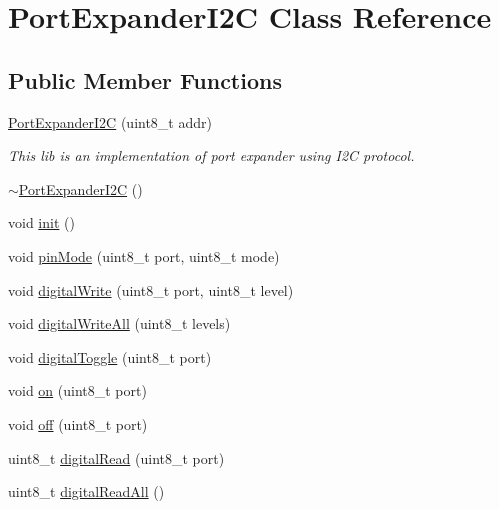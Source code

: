 \hypertarget{classPortExpanderI2C}{}\section{Port\+Expander\+I2C Class Reference}
\label{classPortExpanderI2C}
\subsection*{Public Member Functions}
\begin{DoxyCompactItemize}
\item 
\mbox{\hyperlink{classPortExpanderI2C_ae4f051ad2540a810dfd9edaa8e03c5f7}{Port\+Expander\+I2C}} (uint8\+\_\+t addr)
\begin{DoxyCompactList}\small\item\em This lib is an implementation of port expander using I2C protocol. \end{DoxyCompactList}\item 
\mbox{\hyperlink{classPortExpanderI2C_a0720aaddf0dee2b43435b2df22a52a25}{$\sim$\+Port\+Expander\+I2C}} ()
\item 
void \mbox{\hyperlink{classPortExpanderI2C_ac997f79ae241b47627bd6f74a006c1d4}{init}} ()
\item 
void \mbox{\hyperlink{classPortExpanderI2C_ab3ddb549621ef8622af037eed5171b71}{pin\+Mode}} (uint8\+\_\+t port, uint8\+\_\+t mode)
\item 
void \mbox{\hyperlink{classPortExpanderI2C_abcf3cb2908c42bf061933a19b714dc73}{digital\+Write}} (uint8\+\_\+t port, uint8\+\_\+t level)
\item 
void \mbox{\hyperlink{classPortExpanderI2C_a0f734bdb394c1cf0deebd053ca9a3593}{digital\+Write\+All}} (uint8\+\_\+t levels)
\item 
void \mbox{\hyperlink{classPortExpanderI2C_a7c686d2a180ca46a36a3c72fcebb1b5f}{digital\+Toggle}} (uint8\+\_\+t port)
\item 
void \mbox{\hyperlink{classPortExpanderI2C_a3fb6d4218f75570a71f9b07ebd58a718}{on}} (uint8\+\_\+t port)
\item 
void \mbox{\hyperlink{classPortExpanderI2C_af037e0a92ca4f4ff8a8aca6d9cb70bba}{off}} (uint8\+\_\+t port)
\item 
uint8\+\_\+t \mbox{\hyperlink{classPortExpanderI2C_a514a669283125d213aff4eb4d58f17d9}{digital\+Read}} (uint8\+\_\+t port)
\item 
uint8\+\_\+t \mbox{\hyperlink{classPortExpanderI2C_a460246e95331ace4c1f5f15199098c4c}{digital\+Read\+All}} ()
\end{DoxyCompactItemize}


